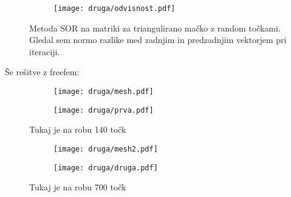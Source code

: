 \documentclass{article}
\begin{document}
\begin{figure}[H]
\centering
\begin{subfigure}{\textwidth}
\texttt{[image: druga/odvisnost.pdf]}
\end{subfigure}
\caption*{Metoda SOR na matriki za triangulirano mačko z random točkami. Gledal sem normo razlike med zadnjim in predzadnjim vektorjem pri iteraciji.}
\end{figure}
Še rešitve z freefem:

\begin{figure}[H]
\centering
\begin{subfigure}{.49\textwidth}
\texttt{[image: druga/mesh.pdf]}
\end{subfigure}
\begin{subfigure}{.49\textwidth}
\texttt{[image: druga/prva.pdf]}
\end{subfigure}
\caption*{Tukaj je na robu 140 točk}
\end{figure}

\begin{figure}[H]
\centering
\begin{subfigure}{.49\textwidth}
\texttt{[image: druga/mesh2.pdf]}
\end{subfigure}
\begin{subfigure}{.49\textwidth}
\texttt{[image: druga/druga.pdf]}
\end{subfigure}
\caption*{Tukaj je na robu 700 točk}
\end{figure}
\end{document}
